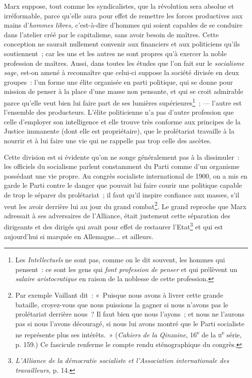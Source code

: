 \documentclass[french,twoside]{book} %
\begin{document}
Marx suppose, tout comme les syndicalistes, que la révolution sera absolue et irréformable, parce qu’elle aura  pour effet de remettre les forces productives aux mains d’\emph{hommes libres,} c’est-à-dire d’hommes qui soient capables de se conduire dans l’atelier créé par le capitalisme, sans avoir besoin de maîtres. Cette conception ne saurait nullement convenir aux financiers et aux politiciens qu’ils soutiennent ; car les uns et les autres ne sont propres qu’à exercer la noble profession de maîtres. Aussi, dans toutes les études que l’on fait sur le \emph{socialisme sage,} est-on amené à reconnaître que celui-ci suppose la société divisée en deux groupes : l’un forme une élite organisée en parti politique, qui se donne pour mission de penser à la place d’une masse non pensante, et qui se croit admirable parce qu’elle veut bien lui faire part de ses lumières supérieures\footnote{ \noindent Les \emph{Intellectuels} ne sont pas, comme on le dit souvent, les hommes qui pensent : ce sont les gens qui \emph{font profession de penser} et qui prélèvent un \emph{salaire aristocratique} en raison de la noblesse de cette profession.
 } ; — l’autre est l’ensemble des producteurs. L’élite politicienne n’a pas d’autre profession que celle d’employer son intelligence et elle trouve très conforme aux principes de la Justice immanente (dont elle est propriétaire), que le prolétariat travaille à la nourrir et à lui faire une vie qui ne rappelle pas trop celle des ascètes.\par
Cette division est si évidente qu’on ne songe généralement pas à la dissimuler : les officiels du socialisme parlent constamment du Parti comme d’un organisme possédant une vie propre. Au congrès socialiste international de 1900, on a mis en garde le Parti contre le danger que pouvait lui faire courir une politique capable de trop le séparer du prolétariat ; il faut qu’il inspire confiance aux  masses, s’il veut les avoir derrière lui au jour du grand combat\footnote{ \noindent Par exemple Vaillant dit : « Puisque nous avons à livrer cette grande bataille, croyez-vous que nous puissions la gagner si nous n’avons pas le prolétariat derrière nous ? Il faut bien que nous l’ayons ; et nous ne l’aurons pas si nous l’avons découragé, si nous lui avons montré que le Parti socialiste ne représente plus ses intérêts. » (\emph{Cahiers de la Qinzaine}, 16\textsuperscript{e} de la {\scshape ii}\textsuperscript{e} série, p. 159.) Ce fascicule renferme le compte rendu sténographique du congrès.
 }. Le grand reproche que Marx adressait à ses adversaires de l’Alliance, était justement cette séparation des dirigeants et des dirigés qui avait pour effet de restaurer l’Etat\footnote{ \noindent \emph{L’Alliance de la démocratie socialiste et l’Association internationale des travailleurs}, p. 14.
 } et qui est aujourd’hui si marquée en Allemagne... et ailleurs.
\end{document}

